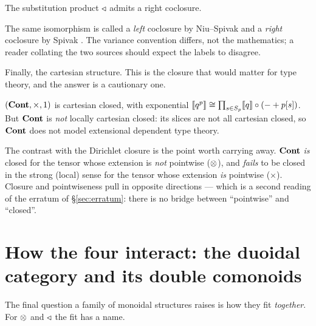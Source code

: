 \begin{Theorem}\label{thm:tricoclose}
The substitution product $\mathbin{\triangleleft}$ admits a right coclosure.
\end{Theorem}

\begin{Remark}\label{rem:coclosenaming}
The same isomorphism is called a \emph{left} coclosure by Niu--Spivak
\cite[Prop.~6.57]{NiuSpivak} and a \emph{right} coclosure by Spivak
\cite[eq.~(68)]{SpivakRef}. The variance convention differs, not the
mathematics; a reader collating the two sources should expect the labels to
disagree.
\end{Remark}

Finally, the cartesian structure. This is the closure that would matter for type
theory, and the answer is a cautionary one.

\begin{Theorem}
\label{thm:ccc}
$(\mathbf{Cont},\times,1)$ is cartesian closed, with exponential
$\llbracket q^p \rrbracket\cong\prod_{s\in S_p}\llbracket q \rrbracket\circ(-+p[s])$. But $\mathbf{Cont}$ is \emph{not}
locally cartesian closed: its slices are not all cartesian closed, so $\mathbf{Cont}$
does not model extensional dependent type theory.
\end{Theorem}

The contrast with the Dirichlet closure is the point worth carrying away. $\mathbf{Cont}$
\emph{is} closed for the tensor whose extension is \emph{not} pointwise ($\mathbin{\otimes}$),
and \emph{fails} to be closed in the strong (local) sense for the tensor whose
extension \emph{is} pointwise ($\times$). Closure and pointwiseness pull in
opposite directions --- which is a second reading of the erratum of
§\ref{sec:erratum}: there is no bridge between ``pointwise'' and ``closed''.

\section{How the four interact: the duoidal category and its double comonoids}
\label{sec:duoidal}

The final question a family of monoidal structures raises is how they fit
\emph{together}. For $\mathbin{\otimes}$ and $\mathbin{\triangleleft}$ the fit has a name.

